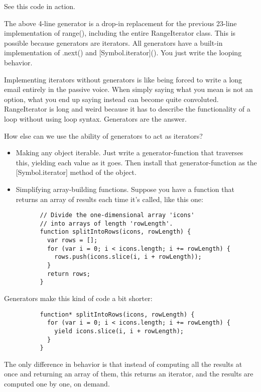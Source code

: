         See this code in action.

        The above 4-line generator is a drop-in replacement for the previous 23-line implementation of range(), including the entire RangeIterator class. This is possible because generators are iterators. All generators have a built-in implementation of .next() and [Symbol.iterator](). You just write the looping behavior.

        Implementing iterators without generators is like being forced to write a long email entirely in the passive voice. When simply saying what you mean is not an option, what you end up saying instead can become quite convoluted. RangeIterator is long and weird because it has to describe the functionality of a loop without using loop syntax. Generators are the answer.

        How else can we use the ability of generators to act as iterators?

        \begin{itemize}
          \item Making any object iterable. Just write a generator-function that traverses this, yielding each value as it goes. Then install that generator-function as the [Symbol.iterator] method of the object.
          \item Simplifying array-building functions. Suppose you have a function that returns an array of results each time it's called, like this one:
        \end{itemize}

        \begin{lstlisting}
          // Divide the one-dimensional array 'icons'
          // into arrays of length 'rowLength'.
          function splitIntoRows(icons, rowLength) {
            var rows = [];
            for (var i = 0; i < icons.length; i += rowLength) {
              rows.push(icons.slice(i, i + rowLength));
            }
            return rows;
          }
        \end{lstlisting}

        Generators make this kind of code a bit shorter:

        \begin{lstlisting}
          function* splitIntoRows(icons, rowLength) {
            for (var i = 0; i < icons.length; i += rowLength) {
              yield icons.slice(i, i + rowLength);
            }
          }
        \end{lstlisting}

        The only difference in behavior is that instead of computing all the results at once and returning an array of them, this returns an iterator, and the results are computed one by one, on demand.

